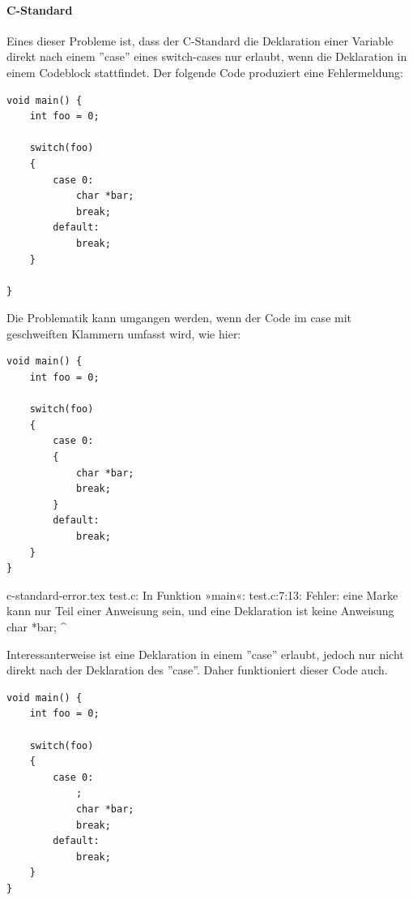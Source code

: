 {\paragraph{C-Standard}
Eines dieser Probleme ist, dass der C-Standard die Deklaration einer Variable
direkt nach einem ''case'' eines switch-cases nur erlaubt, wenn die Deklaration
in einem Codeblock stattfindet.
Der folgende Code produziert eine Fehlermeldung:
\begin{lstlisting}[caption=Problematik mit C-Standard,label=c-standard]
void main() {
    int foo = 0;
    
    switch(foo)
    {
        case 0:
            char *bar;
            break;
        default:
            break;
    }

}
\end{lstlisting}
Die Problematik kann umgangen werden, wenn der Code im case mit geschweiften Klammern
umfasst wird, wie hier:
\begin{lstlisting}[caption=Abhilfe für Problematik mit C-Standard,label=c-standard-fix]
void main() {
    int foo = 0;
    
    switch(foo)
    {
        case 0:
        {
            char *bar;
            break;
        }
        default:
            break;
    }
}
\end{lstlisting}
\begin{filecontents*}{c-standard-error.tex}
test.c: In Funktion »main«:
test.c:7:13: Fehler: eine Marke kann nur Teil einer Anweisung sein, und eine Deklaration ist keine Anweisung
             char *bar;
             ^~~~
\end{filecontents*}



Interessanterweise ist eine Deklaration in einem ''case'' erlaubt, jedoch nur
nicht direkt nach der Deklaration des ''case''.
Daher funktioniert dieser Code auch.

\begin{lstlisting}[caption=Abhilfe mittels NOOP,label=c-standard-noop]
void main() {
    int foo = 0;
    
    switch(foo)
    {
        case 0:
            ;
            char *bar;
            break;
        default:
            break;
    }
}

\end{lstlisting}
}
